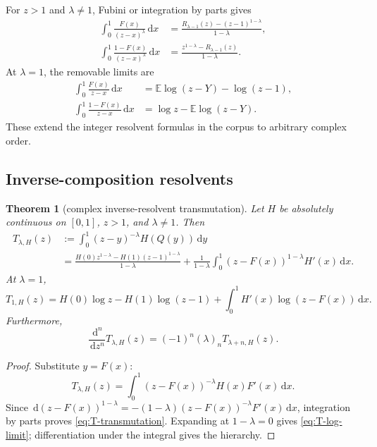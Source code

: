 \documentclass[11pt,oneside]{article}
\numberwithin{equation}{section}
\theoremstyle{plain}
\newtheorem{theorem}{Theorem}[section]
\theoremstyle{definition}
\theoremstyle{remark}
\newcommand{\E}{\mathbb E}
\newcommand{\dd}{\,\mathrm d}
\begin{document}
For $z>1$ and $\lambda\ne1$, Fubini or integration by parts gives
\begin{align}
 \int_0^1\frac{F(x)}{(z-x)^\lambda}\dd x
 &=\frac{R_{\lambda-1}(z)-(z-1)^{1-\lambda}}{1-\lambda},
 \label{eq:F-complex-resolvent}\\
 \int_0^1\frac{1-F(x)}{(z-x)^\lambda}\dd x
 &=\frac{z^{1-\lambda}-R_{\lambda-1}(z)}{1-\lambda}.
 \label{eq:survival-complex-resolvent}
\end{align}
At $\lambda=1$, the removable limits are
\begin{align}
 \int_0^1\frac{F(x)}{z-x}\dd x
 &=\E\log(z-Y)-\log(z-1),
 \label{eq:F-log-resolvent}\\
 \int_0^1\frac{1-F(x)}{z-x}\dd x
 &=\log z-\E\log(z-Y).
 \label{eq:survival-log-resolvent}
\end{align}
These extend the integer resolvent formulas in the corpus to arbitrary complex
order.

\subsection{Inverse-composition resolvents}

\begin{theorem}[complex inverse-resolvent transmutation]
\label{thm:inverse-resolvent}
Let $H$ be absolutely continuous on $[0,1]$, $z>1$, and $\lambda\ne1$.  Then
\begin{align}
 T_{\lambda,H}(z)
 &:=\int_0^1(z-y)^{-\lambda}H(Q(y))\dd y
 \label{eq:T-def}\\
 &=\frac{H(0)z^{1-\lambda}-H(1)(z-1)^{1-\lambda}}
        {1-\lambda}
   +\frac1{1-\lambda}
    \int_0^1(z-F(x))^{1-\lambda}H'(x)\dd x.
 \label{eq:T-transmutation}
\end{align}
At $\lambda=1$,
\begin{equation}
 T_{1,H}(z)
 =H(0)\log z-H(1)\log(z-1)
  +\int_0^1H'(x)\log(z-F(x))\dd x.
 \label{eq:T-log-limit}
\end{equation}
Furthermore,
\begin{equation}
 \frac{\dd^n}{\dd z^n}T_{\lambda,H}(z)
 =(-1)^n(\lambda)_nT_{\lambda+n,H}(z).
 \label{eq:T-derivative-hierarchy}
\end{equation}
\end{theorem}

\begin{proof}
Substitute $y=F(x)$:
\[
 T_{\lambda,H}(z)
 =\int_0^1(z-F(x))^{-\lambda}H(x)F'(x)\dd x.
\]
Since
$\dd(z-F(x))^{1-\lambda}=-(1-\lambda)
(z-F(x))^{-\lambda}F'(x)\dd x$, integration by parts proves
\cref{eq:T-transmutation}.  Expanding at $1-\lambda=0$ gives
\cref{eq:T-log-limit}; differentiation under the integral gives the hierarchy.
\end{proof}
\end{document}
